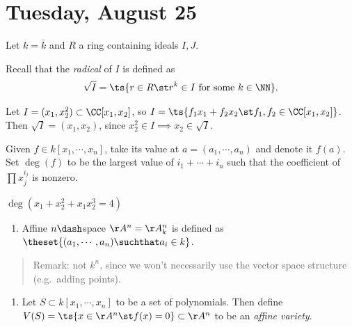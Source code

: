 \hypertarget{tuesday-august-25}{%
\section{Tuesday, August 25}\label{tuesday-august-25}}

Let \(k = \bar k\) and \(R\) a ring containing ideals \(I, J\).

\begin{definition}[Radical]

Recall that the \emph{radical} of \(I\) is defined as
\begin{align*}  
\sqrt{I} = \ts{r\in R \st r^k\in I \text{ for some } k\in \NN}
.\end{align*}

\end{definition}

\begin{example}

Let \(I = (x_1, x_2^2) \subset \CC[x_1, x_2]\), so
\(I = \ts{ f_1 x_1 + f_2 x_2 \st f_1, f_2 \in \CC[x_1, x_2]}\). Then
\(\sqrt{I} = (x_1, x_2)\), since
\(x_2^2 \in I \implies x_2 \in \sqrt{I}\).

\end{example}

Given \(f\in k[x_1, \cdots, x_n]\), take its value at
\(a = (a_1, \cdots, a_n)\) and denote it \(f(a)\). Set \(\deg(f)\) to be
the largest value of \(i_1 + \cdots + i_n\) such that the coefficient of
\(\prod x_j ^{i_j}\) is nonzero.

\begin{example}

\(\deg(x_1 + x_2^2 + x_1 x_2^3 = 4)\)

\end{example}

\begin{definition}

\hfill

\begin{enumerate}
\def\labelenumi{\arabic{enumi}.}
\tightlist
\item
  Affine \(n\dash\)space \(\AA^n = \AA_k^n\) is defined as
  \(\theset{(a_1, \cdots, a_n) \suchthat a_i \in k}\).
\end{enumerate}

\begin{quote}
Remark: not \(k^n\), since we won't necessarily use the vector space
structure (e.g.~adding points).
\end{quote}

\begin{enumerate}
\def\labelenumi{\arabic{enumi}.}
\setcounter{enumi}{1}
\tightlist
\item
  Let \(S\subset k[x_1, \cdots, x_n]\) to be a set of polynomials. Then
  define \(V(S) = \ts{x\in \AA^n \st f(x) = 0} \subset \AA^n\) to be an
  \emph{affine variety}.
\end{enumerate}

\end{definition}

